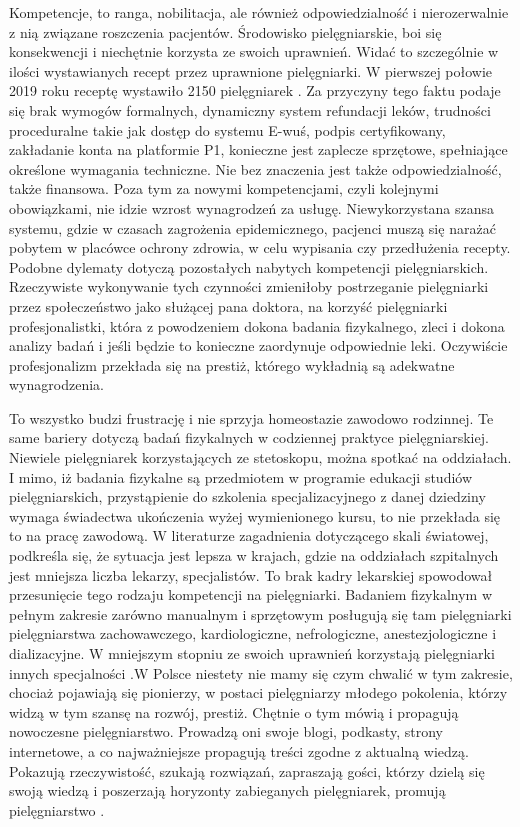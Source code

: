 \documentclass[a4paper,12pt,twoside,openany]{report}
\begin{document}
Kompetencje, to ranga, nobilitacja, ale również odpowiedzialność i nierozerwalnie z nią związane roszczenia pacjentów. Środowisko pielęgniarskie, boi się konsekwencji i niechętnie korzysta ze swoich uprawnień. Widać to szczególnie w ilości wystawianych recept przez uprawnione pielęgniarki. W pierwszej połowie 2019 roku receptę wystawiło 2150 pielęgniarek \cite{model}. Za przyczyny tego faktu podaje się brak wymogów formalnych, dynamiczny system refundacji leków, trudności proceduralne takie jak dostęp do systemu E-wuś, podpis certyfikowany, zakładanie konta na platformie P1, konieczne jest zaplecze sprzętowe, spełniające określone wymagania techniczne.  Nie bez znaczenia jest także odpowiedzialność, także finansowa. Poza tym za nowymi kompetencjami, czyli kolejnymi obowiązkami, nie idzie wzrost wynagrodzeń za usługę. Niewykorzystana szansa systemu, gdzie w czasach zagrożenia epidemicznego, pacjenci muszą się narażać pobytem w placówce ochrony zdrowia, w celu wypisania czy przedłużenia recepty. Podobne dylematy dotyczą pozostałych nabytych kompetencji pielęgniarskich. Rzeczywiste wykonywanie tych czynności zmieniłoby postrzeganie pielęgniarki przez społeczeństwo jako służącej pana doktora, na korzyść pielęgniarki profesjonalistki, która z powodzeniem dokona badania fizykalnego, zleci i dokona analizy badań i jeśli będzie to konieczne zaordynuje odpowiednie leki. Oczywiście profesjonalizm przekłada się na prestiż, którego wykładnią są adekwatne wynagrodzenia. 

To wszystko budzi frustrację i nie sprzyja homeostazie zawodowo rodzinnej.  Te same bariery dotyczą badań fizykalnych w codziennej praktyce pielęgniarskiej. Niewiele  pielęgniarek  korzystających ze stetoskopu,  można spotkać na oddziałach. I mimo, iż badania fizykalne są przedmiotem w programie edukacji studiów pielęgniarskich, przystąpienie do szkolenia specjalizacyjnego z danej dziedziny wymaga świadectwa ukończenia wyżej wymienionego kursu, to nie przekłada się to na pracę zawodową. W literaturze zagadnienia dotyczącego skali światowej, podkreśla się, że sytuacja jest lepsza w krajach, gdzie na oddziałach szpitalnych jest mniejsza liczba lekarzy, specjalistów. To brak kadry lekarskiej spowodował przesunięcie tego rodzaju kompetencji na pielęgniarki. Badaniem fizykalnym w pełnym zakresie zarówno manualnym i sprzętowym posługują się tam pielęgniarki pielęgniarstwa zachowawczego, kardiologiczne, nefrologiczne, anestezjologiczne i dializacyjne. W mniejszym stopniu ze swoich uprawnień korzystają pielęgniarki innych specjalności \cite{badania}.W Polsce niestety nie mamy się czym chwalić w tym zakresie, chociaż pojawiają się pionierzy, w postaci pielęgniarzy młodego pokolenia, którzy widzą w tym szansę na rozwój, prestiż. Chętnie o tym mówią i propagują nowoczesne pielęgniarstwo. Prowadzą oni swoje blogi, podkasty, strony internetowe, a co najważniejsze propagują treści zgodne z aktualną wiedzą.  Pokazują rzeczywistość, szukają rozwiązań, zapraszają gości, którzy dzielą się swoją wiedzą i poszerzają horyzonty zabieganych pielęgniarek, promują pielęgniarstwo \cite{spoty}.
\end{document}
